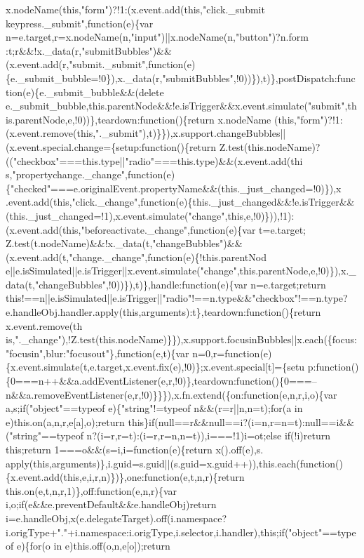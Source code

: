 \begin{DoxyCode}
{       x.nodeName(this,"form")?!1:(x.event.add(this,"click.\_submit keypress.\_submit",function(e)\{var
       n=e.target,r=x.nodeName(n,"input")||x.nodeName(n,"button")?n.form
      :t;r&&!x.\_data(r,"submitBubbles")&&(x.event.add(r,"submit.\_submit",function(e)\{e.\_submit\_bubble=!0\}),x.\_data(r,"submitBubbles",!0))\}),t)\},postDispatch:function(e)\{e.\_submit\_bubble&&(delete
       e.\_submit\_bubble,this.parentNode&&!e.isTrigger&&x.event.simulate("submit",this.parentNode,e,!0))\},teardown:function()\{return
       x.nodeName
      (this,"form")?!1:(x.event.remove(this,".\_submit"),t)\}\}),x.support.changeBubbles||(x.event.special.change=\{setup:function()\{return
       Z.test(this.nodeName)?(("checkbox"===this.type||"radio"===this.type)&&(x.event.add(thi
      s,"propertychange.\_change",function(e)\{"checked"===e.originalEvent.propertyName&&(this.\_just\_changed=!0)\}),x
      .event.add(this,"click.\_change",function(e)\{this.\_just\_changed&&!e.isTrigger&&(this.\_just\_changed=!1),x.event.simulate("change",this,e,!0)\})),!1):(x.event.add(this,"beforeactivate.\_change",function(e)\{var
       t=e.target;
      Z.test(t.nodeName)&&!x.\_data(t,"changeBubbles")&&(x.event.add(t,"change.\_change",function(e)\{!this.parentNod
      e||e.isSimulated||e.isTrigger||x.event.simulate("change",this.parentNode,e,!0)\}),x.\_data(t,"changeBubbles",!0))\}),t)\},handle:function(e)\{var n=e.target;return
       this!==n||e.isSimulated||e.isTrigger||"radio"!==n.type&&"checkbox"!==n.type?e.handleObj.handler.apply(this,arguments):t\},teardown:function()\{return
       x.event.remove(th
      is,".\_change"),!Z.test(this.nodeName)\}\}),x.support.focusinBubbles||x.each(\{focus:"focusin",blur:"focusout"\},function(e,t)\{var
       n=0,r=function(e)\{x.event.simulate(t,e.target,x.event.fix(e),!0)\};x.event.special[t]=\{setu
      p:function()\{0===n++&&a.addEventListener(e,r,!0)\},teardown:function()\{0===--n&&a.removeEventListener(e,r,!0)\}\}\}),x.fn.extend(\{on:function(e,n,r,i,o)\{var a,s;if("object"==typeof e)\{"string"!=typeof
       n&&(r=r||n,n=t);for(a in e)this.on(a,n,r,e[a],o);return this\}if(null==r&&null==i?(i=n,r=n=t):null==i&&("string"==typeof
       n?(i=r,r=t):(i=r,r=n,n=t)),i===!1)i=ot;else if(!i)return this;return 1===o&&(s=i,i=function(e)\{return
       x().off(e),s.
      apply(this,arguments)\},i.guid=s.guid||(s.guid=x.guid++)),this.each(function()\{x.event.add(this,e,i,r,n)\})\},one:function(e,t,n,r)\{return this.on(e,t,n,r,1)\},off:function(e,n,r)\{var
       i,o;if(e&&e.preventDefault&&e.handleObj)return
       i=e.handleObj,x(e.delegateTarget).off(i.namespace?i.origType+"."+i.namespace:i.origType,i.selector,i.handler),this;if("object"==typeof e)\{for(o in e)this.off(o,n,e[o]);return
}
\end{DoxyCode}
